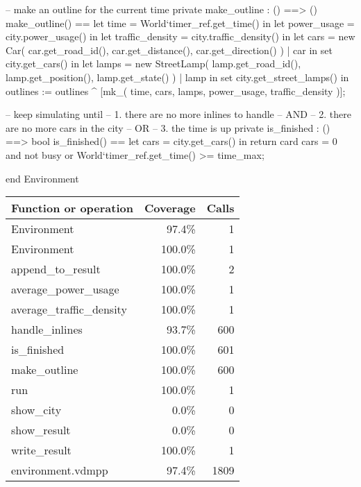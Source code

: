 \documentclass[a4paper]{article}
\begin{document}
\begin{vdm_al}
    -- make an outline for the current time
    private make_outline : () ==> ()
    make_outline() ==
        let time = World`timer_ref.get_time() in
            let power_usage = city.power_usage() in
                let traffic_density = city.traffic_density() in
                    let cars = {
                        new Car(
                            car.get_road_id(),
                            car.get_distance(),
                            car.get_direction()
                        ) | car in set city.get_cars()
                    } in 
                        let lamps = {
                            new StreetLamp(
                                lamp.get_road_id(),
                                lamp.get_position(),
                                lamp.get_state()
                            ) | lamp in set city.get_street_lamps()
                        } in
                            outlines := outlines ^ [mk_(
                                time,
                                cars, lamps,
                                power_usage,
                                traffic_density
                            )];

    -- keep simulating until
    -- 1. there are no more inlines to handle
    -- AND
    -- 2. there are no more cars in the city
    -- OR
    -- 3. the time is up
    private is_finished : () ==> bool 
    is_finished() == 
        let cars = city.get_cars() in
            return card cars = 0 and not busy or World`timer_ref.get_time() >= time_max;
    
end Environment
\end{vdm_al}
\bigskip
\begin{longtable}{|l|r|r|}
\hline
Function or operation & Coverage & Calls \\
\hline
\hline
Environment & 97.4\% & 1 \\
\hline
Environment & 100.0\% & 1 \\
\hline
append\_to\_result & 100.0\% & 2 \\
\hline
average\_power\_usage & 100.0\% & 1 \\
\hline
average\_traffic\_density & 100.0\% & 1 \\
\hline
handle\_inlines & 93.7\% & 600 \\
\hline
is\_finished & 100.0\% & 601 \\
\hline
make\_outline & 100.0\% & 600 \\
\hline
run & 100.0\% & 1 \\
\hline
show\_city & 0.0\% & 0 \\
\hline
show\_result & 0.0\% & 0 \\
\hline
write\_result & 100.0\% & 1 \\
\hline
\hline
environment.vdmpp & 97.4\% & 1809 \\
\hline
\end{longtable}
\end{document}
